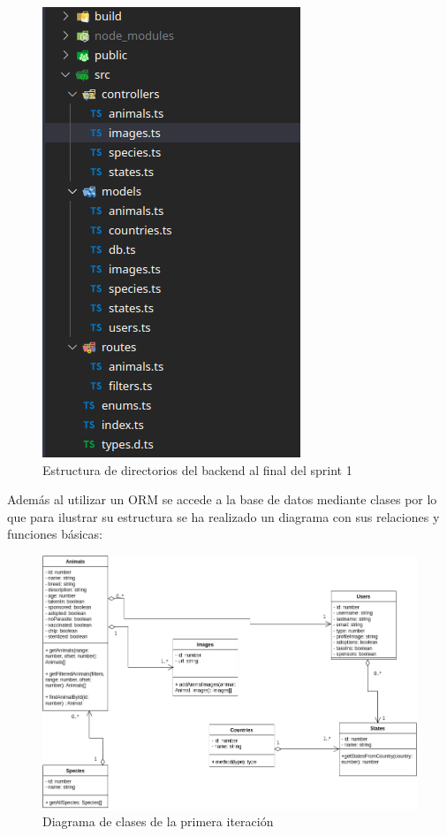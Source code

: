 \begin{figure}[H]
	\centering
	\includegraphics[width=0.7\linewidth]{"sprint 1/directoriosBack"}
	\caption{Estructura de directorios del backend al final del sprint 1}
	\label{fig:directoriosback1}
\end{figure}

Además al utilizar un ORM se accede a la base de datos mediante clases por lo que para ilustrar su estructura se ha realizado un diagrama con sus relaciones y funciones básicas:

\begin{figure}[H]
	\centering
	\includegraphics[width=1\linewidth]{"sprint 1/clases"}
	\caption{Diagrama de clases de la primera iteración}
	\label{fig:clases}
\end{figure}


